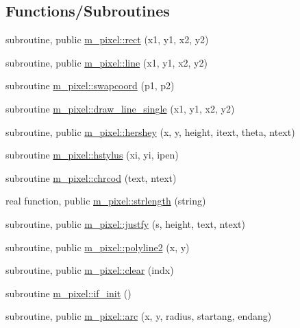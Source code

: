 \subsection*{Functions/\+Subroutines}
\begin{DoxyCompactItemize}
\item 
subroutine, public \mbox{\hyperlink{namespacem__pixel_a5435aa0d9d6048a62c09d7d90665b958}{m\+\_\+pixel\+::rect}} (x1, y1, x2, y2)
\item 
subroutine, public \mbox{\hyperlink{namespacem__pixel_a491951b89e60d0d40d67f22d987da894}{m\+\_\+pixel\+::line}} (x1, y1, x2, y2)
\item 
subroutine \mbox{\hyperlink{namespacem__pixel_a063f74c3dd2f7f086dc47ec68abc22c9}{m\+\_\+pixel\+::swapcoord}} (p1, p2)
\item 
subroutine \mbox{\hyperlink{namespacem__pixel_a42791c7e58158616dae7c36ec5806717}{m\+\_\+pixel\+::draw\+\_\+line\+\_\+single}} (x1, y1, x2, y2)
\item 
subroutine, public \mbox{\hyperlink{namespacem__pixel_a80dc3cb149287470a9837de8dd3f05bc}{m\+\_\+pixel\+::hershey}} (x, y, height, itext, theta, ntext)
\item 
subroutine \mbox{\hyperlink{namespacem__pixel_a15c5daa9ab477991c2c6e17741cf40eb}{m\+\_\+pixel\+::hstylus}} (xi, yi, ipen)
\item 
subroutine \mbox{\hyperlink{namespacem__pixel_ab25c6cce708ff91a79bbabb23d591a8b}{m\+\_\+pixel\+::chrcod}} (text, ntext)
\item 
real function, public \mbox{\hyperlink{namespacem__pixel_a0468f8d9308bade7f8f2a68a133271d2}{m\+\_\+pixel\+::strlength}} (string)
\item 
subroutine, public \mbox{\hyperlink{namespacem__pixel_a7b08886c913b47694edeb60fa747afc4}{m\+\_\+pixel\+::justfy}} (s, height, text, ntext)
\item 
subroutine, public \mbox{\hyperlink{namespacem__pixel_a0678be124889fb633475a6724ddb6640}{m\+\_\+pixel\+::polyline2}} (x, y)
\item 
subroutine, public \mbox{\hyperlink{namespacem__pixel_af3b81a21a0b2f6b5eddd09c031bd6173}{m\+\_\+pixel\+::clear}} (indx)
\item 
subroutine \mbox{\hyperlink{namespacem__pixel_a6c23c2779e54da4ac7505cfb816cc2b1}{m\+\_\+pixel\+::if\+\_\+init}} ()
\item 
subroutine, public \mbox{\hyperlink{namespacem__pixel_ab881b9c2adff081a086cd83a1f1341fb}{m\+\_\+pixel\+::arc}} (x, y, radius, startang, endang)
\item 

\end{DoxyCompactItemize}
